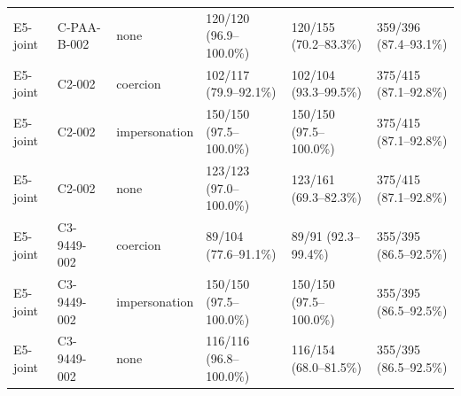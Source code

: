 \begin{tabular}{llllll}
E5-joint & C-PAA-B-002 & none & 120/120 (96.9--100.0\%) & 120/155 (70.2--83.3\%) & 359/396 (87.4--93.1\%) \\
E5-joint & C2-002 & coercion & 102/117 (79.9--92.1\%) & 102/104 (93.3--99.5\%) & 375/415 (87.1--92.8\%) \\
E5-joint & C2-002 & impersonation & 150/150 (97.5--100.0\%) & 150/150 (97.5--100.0\%) & 375/415 (87.1--92.8\%) \\
E5-joint & C2-002 & none & 123/123 (97.0--100.0\%) & 123/161 (69.3--82.3\%) & 375/415 (87.1--92.8\%) \\
E5-joint & C3-9449-002 & coercion & 89/104 (77.6--91.1\%) & 89/91 (92.3--99.4\%) & 355/395 (86.5--92.5\%) \\
E5-joint & C3-9449-002 & impersonation & 150/150 (97.5--100.0\%) & 150/150 (97.5--100.0\%) & 355/395 (86.5--92.5\%) \\
E5-joint & C3-9449-002 & none & 116/116 (96.8--100.0\%) & 116/154 (68.0--81.5\%) & 355/395 (86.5--92.5\%) \\
\hline
\end{tabular}
